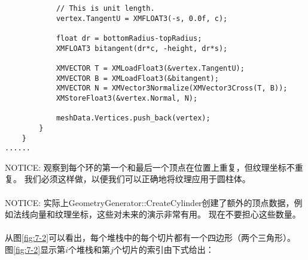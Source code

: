 \begin{lstlisting}
            // This is unit length.
            vertex.TangentU = XMFLOAT3(-s, 0.0f, c);

            float dr = bottomRadius-topRadius;
            XMFLOAT3 bitangent(dr*c, -height, dr*s);

            XMVECTOR T = XMLoadFloat3(&vertex.TangentU);
            XMVECTOR B = XMLoadFloat3(&bitangent);
            XMVECTOR N = XMVector3Normalize(XMVector3Cross(T, B));
            XMStoreFloat3(&vertex.Normal, N);

            meshData.Vertices.push_back(vertex);
        }
    }
......
\end{lstlisting}
\begin{flushleft}
NOTICE: 观察到每个环的第一个和最后一个顶点在位置上重复，但纹理坐标不重复。 我们必须这样做，以便我们可以正确地将纹理应用于圆柱体。\\
~\\
NOTICE: 实际上GeometryGenerator::CreateCylinder创建了额外的顶点数据，例如法线向量和纹理坐标，这些对未来的演示非常有用。 现在不要担心这些数量。\\
~\\
从图\ref{fig:7-2}可以看出，每个堆栈中的每个切片都有一个四边形（两个三角形）。 图\ref{fig:7-2}显示第$i$个堆栈和第$j$个切片的索引由下式给出：\\
\end{flushleft}
